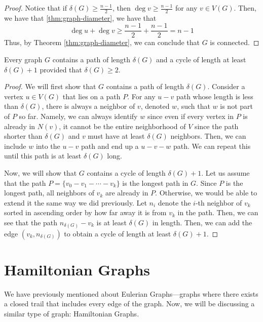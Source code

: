 \begin{proof}
  Notice that if \(\delta(G) \geq \frac{n-1}{2}\), then \(\deg v \geq
  \frac{n-1}{2}\) for any \(v \in V(G)\). Then, we have that
  \ref{thm:graph-diameter}, we have that
  \[ \deg u + \deg v \geq \frac{n-1}{2} + \frac{n-1}{2} = n-1 \]
  Thus, by Theorem \ref{thm:graph-diameter}, we can conclude that \(G\) is
  connected.
\end{proof}

\begin{proposition}
  Every graph \(G\) contains a path of length \(\delta(G)\) and a cycle of
  length at least \(\delta(G) + 1\) provided that \(\delta(G) \geq 2\).
\end{proposition}

\begin{proof}
  We will first show that \(G\) contains a path of length \(\delta(G)\).
  Consider a vertex \(u \in V(G)\) that lies on a path \(P\). For any \(u - v\) path whose length is
  less than \(\delta(G)\), there is always a neighbor of \(v\), denoted
  \(w\), such that \(w\) is not part of \(P\) so far. Namely, we can always 
  identify \(w\) since even if every vertex in \(P\) is already in \(N(v)\), 
  it cannot be the entire neighborhood of \(V\) since the path shorter than
  \(\delta(G)\) and \(v\) must have at least \(\delta(G)\) neighbors. Then, we 
  can include \(w\) into the \(u - v\) path and end up a \(u - v - w\) path.
  We can repeat this until this path is at least \(\delta(G)\) long.

  Now, we will show that \(G\) contains a cycle of length \(\delta(G) + 1\).
  Let us assume that the path \(P = \{v_0 - v_1 - \cdots - v_k\}\) is the
  longest path in \(G\). Since \(P\) is the longest path, all neighbors of 
  \(v_k\) are already in \(P\). Otherwise, we would be able to extend it the
  same way we did previously. Let \(n_i\) denote the \(i\)-th neighbor of
  \(v_k\) sorted in ascending order by how far away it is from \(v_k\) in the 
  path. Then, we can see that the path \(n_{\delta(G)} - v_k\) is at least
  \(\delta(G)\) in length. Then, we can add the edge \((v_k, n_{\delta(G)})\) to
  obtain a cycle of length at least \(\delta(G) + 1\).
\end{proof}

\section{Hamiltonian Graphs}

We have previously mentioned about Eulerian Graphs---graphs where there exists a
closed trail that includes every edge of the graph. Now, we will be discussing a
similar type of graph: Hamiltonian Graphs. 

